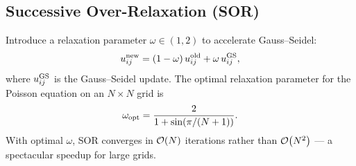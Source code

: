 \subsection{Successive Over-Relaxation (SOR)}\label{subsec:lec15:sor}

Introduce a relaxation parameter $\omega\in(1,2)$ to accelerate
Gauss–Seidel:
\begin{equation}
  u_{ij}^{\rm new} = (1-\omega)\,u_{ij}^{\rm old}
                   + \omega\,u_{ij}^{\rm GS},
  \label{eq:lec15:sor}
\end{equation}
where $u_{ij}^{\rm GS}$ is the Gauss–Seidel update.  The optimal
relaxation parameter for the Poisson equation on an $N\times N$ grid is
\begin{equation}
  \omega_{\rm opt} = \frac{2}{1+\sin(\pi/(N+1))}.
  \label{eq:lec15:omega_opt}
\end{equation}
With optimal $\omega$, SOR converges in $\mathcal{O}\!\left(N\right)$ iterations rather
than $\mathcal{O}\!\left(N^2\right)$ — a spectacular speedup for large grids.

